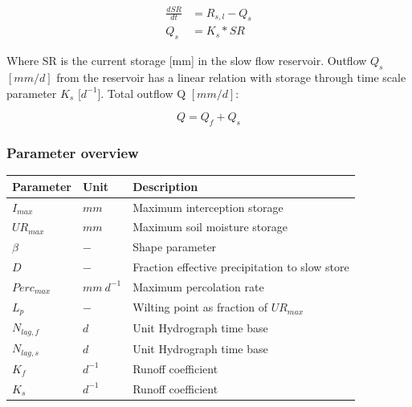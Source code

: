 \begin{align}
	\frac{dSR}{dt} &= R_{s,l} - Q_s \\
	Q_s &= K_s * SR 
\end{align}

Where SR is the current storage [mm] in the slow flow reservoir. Outflow $Q_s$ $[mm/d]$ from the reservoir has a linear relation with storage through time scale parameter $K_s$ [$d^{-1}$]. Total outflow Q  $[mm/d]$:

\begin{equation}
	Q = Q_f + Q_s
\end{equation}

\subsubsection{Parameter overview}
\begin{table}[htbp]
  \centering
    \begin{tabular}{lll}
    \toprule
    Parameter & Unit  & Description \\
    \midrule
    $I_{max}$ & $mm$  & Maximum interception storage \\
    $UR_{max}$ & $mm$  & Maximum soil moisture storage \\
    $\beta$ & $-$   & Shape parameter \\
    $D$   & $-$   & Fraction effective precipitation to slow store \\
    $Perc_{max}$ & $mm~d^{-1}$ & Maximum percolation rate \\
    $L_p$ & $-$   & Wilting point as fraction of $UR_{max}$ \\
    $N_{lag,f}$ & $d$   & Unit Hydrograph time base \\
    $N_{lag,s}$ & $d$   & Unit Hydrograph time base \\
    $K_f$ & $d^{-1}$ & Runoff coefficient \\
    $K_s$ & $d^{-1}$ & Runoff coefficient \\
    \bottomrule
    \end{tabular}%
  \label{tab:addlabel}%
\end{table}%

